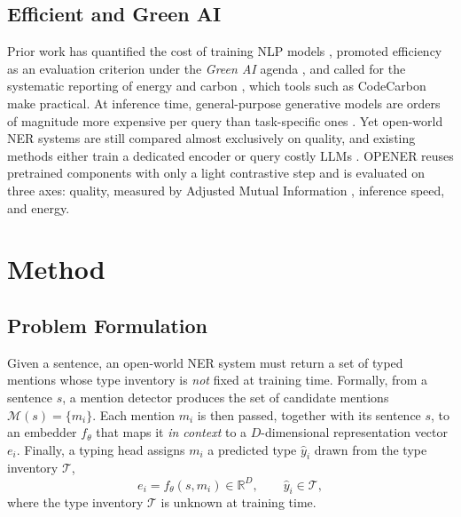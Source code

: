 \documentclass[pdflatex,sn-basic,Numbered]{sn-jnl}
\begin{document}
\subsection{Efficient and Green AI}
\label{sec:related:green}
{
Prior work has quantified the cost of training NLP models \cite{strubell2019energy}, promoted efficiency as an evaluation criterion under the \emph{Green AI} agenda \cite{schwartz2020greenai}, and called for the systematic reporting of energy and carbon \cite{henderson2020systematic}, which tools such as CodeCarbon \cite{luccioni2019quantifying} make practical.
At inference time, general-purpose generative models are orders of magnitude more expensive per query than task-specific ones \cite{luccioni2024power}.
Yet open-world NER systems are still compared almost exclusively on quality, and existing methods either train a dedicated encoder \cite{genest2025owner} or query costly LLMs \cite{zhou2024universalner, sainz2024gollie}.
OPENER reuses pretrained components with only a light contrastive step and is evaluated on three axes: quality, measured by Adjusted Mutual Information \cite{vinh2010ami}, inference speed, and energy.
\par}

\section{Method}
\label{sec:method}

\subsection{Problem Formulation}
\label{sec:method:problem}
Given a sentence, an open-world NER system must return a set of typed mentions whose type inventory is \emph{not} fixed at training time.
Formally, from a sentence $s$, a mention detector produces the set of candidate mentions $\mathcal{M}(s)=\{m_i\}$. Each mention $m_i$ is then passed, together with its sentence $s$, to an embedder $f_\theta$ that maps it \emph{in context} to a $D$-dimensional representation vector $e_i$. Finally, a typing head assigns $m_i$ a predicted type $\hat y_i$ drawn from the type inventory $\mathcal{T}$,
\begin{equation}
e_i = f_\theta(s, m_i)\in\mathbb{R}^{D},\qquad \hat y_i\in\mathcal{T},
\end{equation}
where the type inventory $\mathcal{T}$ is unknown at training time.
\end{document}
